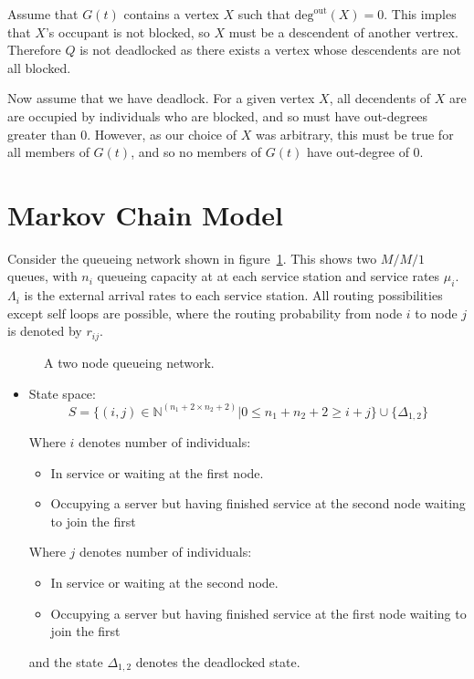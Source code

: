 \documentclass{article}
\begin{document}
Assume that $G(t)$ contains a vertex $X$ such that $\text{deg}^{\text{out}}(X) = 0$.
This imples that $X$'s occupant is not blocked, so $X$ must be a descendent of another vertrex.
Therefore $Q$ is not deadlocked as there exists a vertex whose descendents are not all blocked.\newline

Now assume that we have deadlock.
For a given vertex $X$, all decendents of $X$ are are occupied by individuals who are blocked, and so must have out-degrees greater than 0.
However, as our choice of $X$ was arbitrary, this must be true for all members of $G(t)$, and so no members of $G(t)$ have out-degree of 0.\newline


\section{Markov Chain Model}

Consider the queueing network shown in figure~\ref{fig:queueingnetwork_2nodes}.
This shows two \(M/M/1\) queues, with \(n_i\) queueing capacity at at each service station and service rates $\mu_i$.
$\Lambda_i$ is the external arrival rates to each service station.
All routing possibilities except self loops are possible, where the routing probability from node $i$ to node $j$ is denoted by $r_{ij}$.

\begin{figure}[H]
  
  \caption{A two node queueing network.}
  \label{fig:queueingnetwork_2nodes}
\end{figure}

\begin{itemize}
    \item State space:
        \[S = \{(i,j)\in\mathbb{N}^{(n_1+2\times n_2+2)}| 0 \leq n_1 + n_2 + 2
        \geq i + j \}\cup\{\Delta_{1,2}\}\]

        Where \(i\) denotes number of individuals:
            \begin{itemize}
                \item In service or waiting at the first node.
                \item Occupying a server but having finished service at the
                    second node waiting to join the first
            \end{itemize}
        Where \(j\) denotes number of individuals:
            \begin{itemize}
                \item In service or waiting at the second node.
                \item Occupying a server but having finished service at the
                    first node waiting to join the first
            \end{itemize}
        and the state \(\Delta_{1,2}\) denotes the deadlocked state.
\end{itemize}
\end{document}
